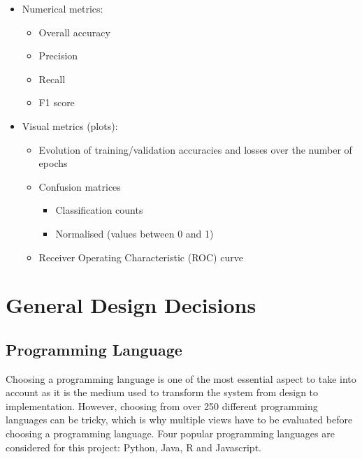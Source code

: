 \begin{itemize}
    \item Numerical metrics:
    \begin{itemize}
        \item Overall accuracy
        \item Precision
        \item Recall
        \item F1 score
    \end{itemize}
    \item Visual metrics (plots):
    \begin{itemize}
        \item Evolution of training/validation accuracies and losses over the number of epochs
        \item Confusion matrices
        \begin{itemize}
            \item Classification counts
            \item Normalised (values between 0 and 1)
        \end{itemize}
        \item Receiver Operating Characteristic (ROC) curve
    \end{itemize}
\end{itemize}


\section{General Design Decisions}

\subsection{Programming Language}

Choosing a programming language is one of the most essential aspect to take into account as it is the medium used to transform the system from design to implementation. However, choosing from over 250 different programming languages \citep{tiobe} can be tricky, which is why multiple views have to be evaluated before choosing a programming language. Four popular programming languages are considered for this project: Python, Java, R and  Javascript.\\

